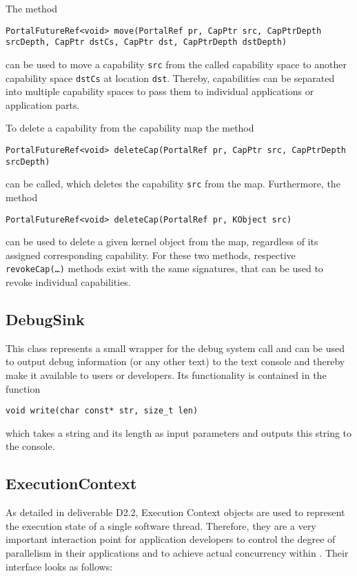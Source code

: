 The method
\lstset{language=c++,numbers=none}
\begin{lstlisting}
PortalFutureRef<void> move(PortalRef pr, CapPtr src, CapPtrDepth srcDepth, CapPtr dstCs, CapPtr dst, CapPtrDepth dstDepth)
\end{lstlisting}
\noindent can be
used to move a capability \texttt{src} from the called capability space to
another capability space \texttt{dstCs} at location \texttt{dst}. Thereby,
capabilities can be separated into multiple capability spaces to pass them to
individual applications or application parts.

To delete a capability from the capability map the method
\lstset{language=c++,numbers=none}
\begin{lstlisting}
PortalFutureRef<void> deleteCap(PortalRef pr, CapPtr src, CapPtrDepth srcDepth)
\end{lstlisting}
\noindent can be called, which deletes the capability \texttt{src} from the
map. Furthermore, the method
\lstset{language=c++,numbers=none}
\begin{lstlisting}
PortalFutureRef<void> deleteCap(PortalRef pr, KObject src)
\end{lstlisting}
\noindent can be used to delete a given kernel object from the map,
regardless of its assigned corresponding capability. For these two methods,
respective \texttt{revokeCap(\ldots)} methods exist with the same signatures, that can
be used to revoke individual capabilities.

\subsection{DebugSink}
This class represents a small wrapper for the debug system call and can be used
to output debug information (or any other text) to the text console and thereby
make it available to users or developers. Its functionality is contained in the
function
\lstset{language=c++,numbers=none}
\begin{lstlisting}
void write(char const* str, size_t len)
\end{lstlisting}
\noindent which takes a string
and its length as input parameters and outputs this string to the console.

\subsection{ExecutionContext}
As detailed in deliverable D2.2, Execution Context objects are used to
represent the execution state of a single software thread. Therefore, they are a
very important interaction point for application developers to control the
degree of parallelism in their applications and to achieve actual concurrency
within \mythos. Their interface looks as follows:

